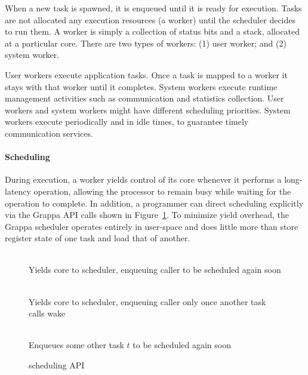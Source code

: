 When a new task is spawned, it is enqueued until it is ready for execution.
Tasks are not allocated any execution resources (a worker) until the scheduler
decides to run them. A worker is simply a collection of status bits and a
stack, allocated at a particular core. There are two types of workers: (1) user worker; and (2) system worker. 

User workers execute application tasks. Once a task is mapped to a worker it
stays with that worker until it completes. System workers execute runtime
management activities such as communication and statistics collection. User
workers and system workers might have different scheduling priorities. System
workers execute periodically and in idle times, to guarantee timely
communication services.

\paragraph{Scheduling} 

During execution, a worker yields control of its core whenever it performs a
long-latency operation, allowing the processor to remain busy while waiting
for the operation to complete. In addition, a programmer can direct scheduling
explicitly via the Grappa API calls shown in Figure~\ref{fig:scheduling}. To
minimize yield overhead, the Grappa scheduler operates entirely in user-space
and does little more than store register state of one task and load that of
another.

\begin{figure}[htbp]
  \begin{center}
    \begin{description}\small
    \item[ \texttt{ yield() } ] \hfill \\
      Yields core to scheduler, enqueuing caller to be scheduled again soon
    \item[ \texttt{ suspend() } ] \hfill \\
      Yields core to scheduler, enqueuing caller only once another task calls wake
    \item[ \texttt{ wake( task * $t$ ) } ] \hfill \\
      Enqueues some other task $t$ to be scheduled again soon
    \end{description}
    \begin{minipage}{0.95\columnwidth}
      \caption{\label{fig:scheduling} \Grappa scheduling API } 
    \end{minipage}
  \end{center}
\end{figure}

